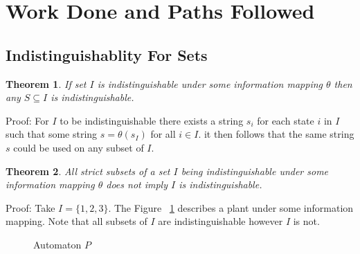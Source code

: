 \documentclass{article}
\newtheorem{thm}{Theorem}
\begin{document}
	\section{Work Done and Paths Followed}
		\subsection{Indistinguishablity For Sets}

			\begin{thm}
			If set $I$ is indistinguishable under some information mapping $\theta$ then any $S \subseteq I$ is indistinguishable.
			\end{thm} 

			Proof: For $I$ to be indistinguishable there exists a string $s_i$ for each state $i$ in $I$ such that some string $s = \theta (s_I)$ for all $i \in I$. it then follows that the same string $s$ could be used on any subset of $I$.

			\begin{thm}
			All strict subsets of a set $I$ being indistinguishable under some information mapping $\theta$ does not imply $I$ is indistinguishable.
			\end{thm}

			Proof: Take $I = \{1,2,3\}$. The Figure ~\ref{fig:figure1} describes a plant under some information mapping. Note that all subsets of $I$ are indistinguishable however $I$ is not.

			\begin{figure}[ht]
				\begin{minipage}[b]{\linewidth}
				\centering
				    \caption{Automaton $P$}
				    \label{fig:figure1}
				\end{minipage}
			\end{figure}
\end{document}
